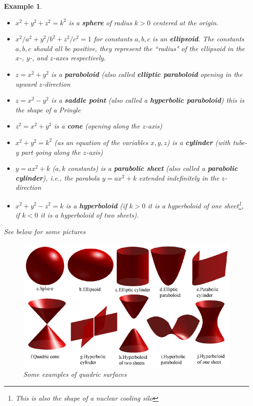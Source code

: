 \documentclass[12pt]{article}
\numberwithin{equation}{subsection}
\numberwithin{figure}{subsection}
\theoremstyle{note}
\newtheorem{example}[subsection]{Example}
\begin{document}
{\begin{example}
\begin{itemize}
	\item $x^2+y^2+z^2=k^2$ is a \textbf{sphere} of radius $k>0$ centered at the origin.
	\item $x^2/a^2+y^2/b^2+z^2/c^2=1$ for constants $a,b,c$ is an \textbf{ellipsoid}. The constants $a,b,c$ should all be positive, they represent the ``radius" of the ellipsoid in the $x$-, $y$-, and $z$-axes respectively.
	\item $z=x^2+y^2$ is a \textbf{paraboloid} (also called \textbf{elliptic paraboloid} opening in the upward $z$-direction
	\item $z=x^2-y^2$ is a \textbf{saddle point} (also called a \textbf{hyperbolic paraboloid}) this is the shape of a Pringle
	\item $z^2=x^2+y^2$ is a \textbf{cone} (opening along the $z$-axis)
	\item $x^2+y^2=k^2$ (as an equation of the variables $x,y,z$) is a \textbf{cylinder} (with tube-y part going along the $z$-axis)
	\item $y=ax^2+k$ ($a,k$ constants) is a \textbf{parabolic sheet} (also called a \textbf{parabolic cylinder}), i.e., the parabola $y=ax^2+k$ extended indefinitely in the $z$-direction
	\item $x^2+y^2-z^2=k$ is a \textbf{hyperboloid} (if $k>0$ it is a hyperboloid of one sheet\footnote{This is also the shape of a nuclear cooling silo}, if $k<0$ it is a hyperboloid of two sheets). 
\end{itemize}
See below for some pictures 
\begin{figure}[h!]
\centering
\includegraphics[width=150mm]{Images/quadrics}
\caption{Some examples of quadric surfaces}
\label{fig-quadrics}
\end{figure}


\end{example}}
\end{document}

